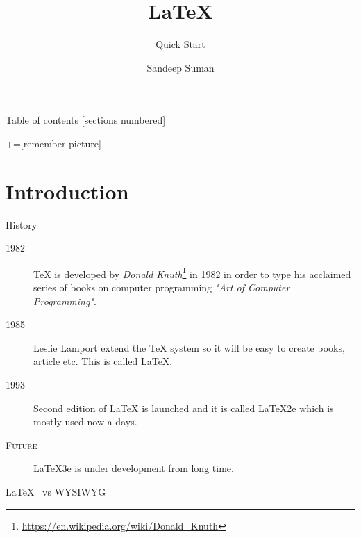 \documentclass[10pt]{beamer}
\title{\LaTeX}
\subtitle{Quick Start}
\date{}
\author{Sandeep Suman}
\institute{Tilka Manjhi Bhagalpur University, Bhagalpur}
\begin{document}
\maketitle

\begin{frame}{Table of contents}
  [sections numbered]
  \tableofcontents[hideallsubsections]
\end{frame}
+=[remember picture]
\section{Introduction}
\begin{frame}{History}
  \begin{description}
     \item[1982] {\TeX}  is developed by {\em Donald Knuth}\footnote{\url{https://en.wikipedia.org/wiki/Donald_Knuth}} in 1982 in order to 	type his acclaimed series of books on computer programming \emph{"Art of Computer Programming"}. 
     
     \item[1985]  Leslie Lamport extend the {\TeX} system so it will be easy to create books, article etc. This is called {\LaTeX}.
          
     \item[1993] Second edition of {\LaTeX} is launched and it is called {\LaTeX2e} which is mostly used now a days.
     
     \item[\textsc{Future}] {\LaTeX3e} is under development from long time.
     
  \end{description}
\end{frame}


\begin{frame}[fragile]{{\LaTeX ~} vs WYSIWYG}
    \begin{itemize}
    \end{itemize}
  
	\begin{itemize}
    \end{itemize}
\end{frame}  
\end{document}
